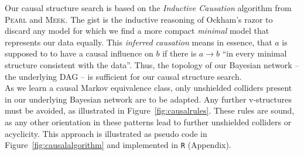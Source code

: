 \documentclass[twoside,twocolumn]{article}
\begin{document}
Our causal structure search is based on the \textit{Inductive Causation} algorithm from \textsc{Pearl} and  \textsc{Meek}. The gist is the inductive reasoning of Ockham's razor  to discard any model for which we find a more compact \textit{minimal} model that represents our data equally. This \textit{inferred causation} means in essence, that $a$ is supposed to to have a causal influence on $b$ if there is $a \rightarrow b$  \enquote{in every minimal structure consistent with the data}\cite[p. 45]{Pearl2009}. Thus, the topology of our Bayesian network -- the underlying DAG -- is sufficient for our causal structure search. \cite{Meek1995} \cite{Pearl1991} \cite{Pearl2009} \cite{Druzdzel2009}\\
As we learn a causal Markov equivalence class, only unshielded colliders present in our underlying Bayesian network are to be adapted. Any further v-structures  must be avoided, as illustrated in Figure~\ref{fig:causalrules}.  These rules are sound, as any other orientation in these patterns lead to further unshielded colliders or acyclicity. This approach is illustrated as pseudo code in Figure~\ref{fig:causalalgorithm} and implemented in \texttt{R} (Appendix). \cite{Meek1995} \cite{Pearl1991}   
\end{document}
